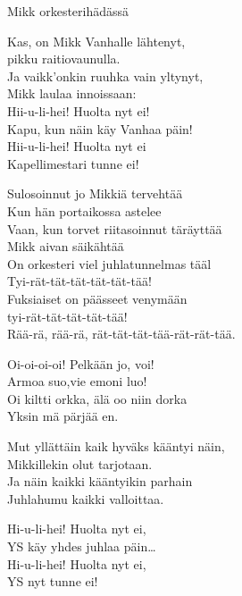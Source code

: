 \begin{song}{Mikk orkesterihädässä}


    Kas, on Mikk Vanhalle lähtenyt,\\
    pikku raitiovaunulla.\\
    Ja vaikk'onkin ruuhka vain yltynyt,\\
    Mikk laulaa innoissaan:\\
    Hii-u-li-hei! Huolta nyt ei!\\
    Kapu, kun näin käy Vanhaa päin!\\
    Hii-u-li-hei! Huolta nyt ei\\
    Kapellimestari tunne ei! 

    Sulosoinnut jo Mikkiä tervehtää\\
    Kun hän portaikossa astelee\\
    Vaan, kun torvet riitasoinnut täräyttää\\
    Mikk aivan säikähtää\\
    On orkesteri viel juhlatunnelmas tääl\\
    Tyi-rät-tät-tät-tät-tät-tää!\\
    Fuksiaiset on päässeet venymään\\
    tyi-rät-tät-tät-tät-tää!\\
    Rää-rä, rää-rä, rät-tät-tät-tää-rät-rät-tää.

    Oi-oi-oi-oi! Pelkään jo, voi!\\
    Armoa suo,vie emoni luo!\\
    Oi kiltti orkka, älä oo niin dorka\\
    Yksin mä pärjää en. 

    Mut yllättäin kaik hyväks kääntyi näin,\\
    Mikkillekin olut tarjotaan.\\
    Ja näin kaikki kääntyikin parhain\\
    Juhlahumu kaikki valloittaa.

    Hi-u-li-hei! Huolta nyt ei,\\
    YS käy yhdes juhlaa päin\dots\\
    Hi-u-li-hei! Huolta nyt ei,\\
    YS nyt tunne ei!

\end{song}